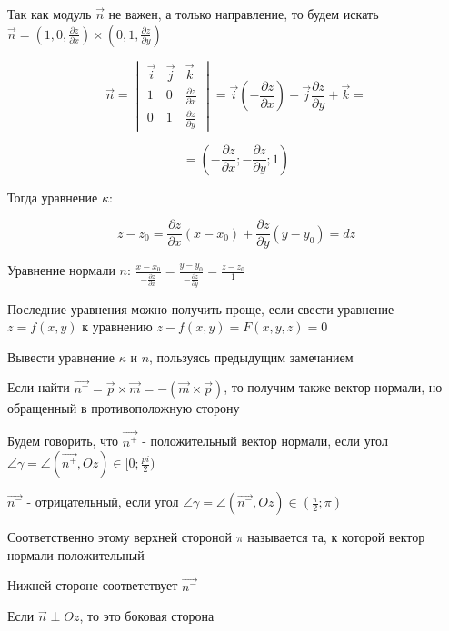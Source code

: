 \documentclass[12pt]{article}
\begin{document}
    Так как модуль $\overrightarrow{n}$ не важен, а только направление, то будем искать
    $\overrightarrow{n} = \left(1, 0, \frac{\partial z}{\partial x}\right) \times \left(0, 1, \frac{\partial z}{\partial y}\right)$

    \[\overrightarrow{n} =
    \begin{vmatrix} \overrightarrow{i} & \overrightarrow{j} & \overrightarrow{k} \\
        1 & 0 & \frac{\partial z}{\partial x} \\ 0 & 1 & \frac{\partial z}{\partial y}
    \end{vmatrix} = \overrightarrow{i} \left(-\frac{\partial z}{\partial x}\right) - \overrightarrow{j} \frac{\partial z}{\partial y} + \overrightarrow{k} = \]

    \[= \left(-\frac{\partial z}{\partial x}; -\frac{\partial z}{\partial y}; 1\right)\]

    Тогда уравнение $\kappa$:

    \[z - z_0 = \frac{\partial z}{\partial x}(x - x_0) + \frac{\partial z}{\partial y} (y - y_0) = dz\]

    Уравнение нормали $n$: $\frac{x - x_0}{-\frac{\partial z}{\partial x}} = \frac{y - y_0}{-\frac{\partial z}{\partial y}} = \frac{z - z_0}{1}$

    \Nota Последние уравнения можно получить проще, если свести уравнение $z = f(x, y)$ к уравнению $z - f(x, y) = F(x, y, z) = 0$

    \Lab Вывести уравнение $\kappa$ и $n$, пользуясь предыдущим замечанием

    \Nota Если найти $\overrightarrow{n^-} = \overrightarrow{p} \times \overrightarrow{m} = - (\overrightarrow{m} \times \overrightarrow{p})$, то получим также вектор нормали, но обращенный в противоположную сторону

    Будем говорить, что $\overrightarrow{n^+}$ - положительный вектор нормали, если угол $\angle\gamma = \angle (\overrightarrow{n^+}, Oz) \in [0; \frac{pi}{2})$

    $\overrightarrow{n^-}$ - отрицательный, если угол $\angle\gamma = \angle (\overrightarrow{n^-}, Oz) \in \left(\frac{\pi}{2}; \pi\right)$

    Соответственно этому верхней стороной $\pi$ называется та, к которой вектор нормали положительный

    Нижней стороне соответствует $\overrightarrow{n^-}$

    Если $\overrightarrow{n} \perp Oz$, то это боковая сторона
\end{document}
